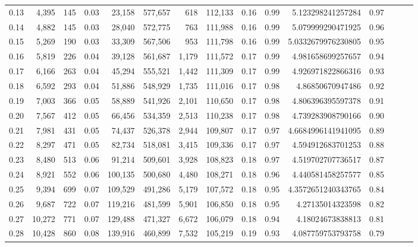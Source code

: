 \begin{tabular}{rrrrrrrrrrrrrrr}
0.13 &   4,395 &    145 &  0.03 &   23,158 &  577,657 &      618 &  112,133 &  0.16 &  0.99 &       5.123298241257284 &      0.97 \\
0.14 &   4,882 &    145 &  0.03 &   28,040 &  572,775 &      763 &  111,988 &  0.16 &  0.99 &       5.079999290471925 &      0.96 \\
0.15 &   5,269 &    190 &  0.03 &   33,309 &  567,506 &      953 &  111,798 &  0.16 &  0.99 &      5.0332679976230805 &      0.95 \\
0.16 &   5,819 &    226 &  0.04 &   39,128 &  561,687 &    1,179 &  111,572 &  0.17 &  0.99 &       4.981658699257657 &      0.94 \\
0.17 &   6,166 &    263 &  0.04 &   45,294 &  555,521 &    1,442 &  111,309 &  0.17 &  0.99 &       4.926971822866316 &      0.93 \\
0.18 &   6,592 &    293 &  0.04 &   51,886 &  548,929 &    1,735 &  111,016 &  0.17 &  0.98 &        4.86850670947486 &      0.92 \\
0.19 &   7,003 &    366 &  0.05 &   58,889 &  541,926 &    2,101 &  110,650 &  0.17 &  0.98 &       4.806396395597378 &      0.91 \\
0.20 &   7,567 &    412 &  0.05 &   66,456 &  534,359 &    2,513 &  110,238 &  0.17 &  0.98 &       4.739283908790166 &      0.90 \\
0.21 &   7,981 &    431 &  0.05 &   74,437 &  526,378 &    2,944 &  109,807 &  0.17 &  0.97 &      4.6684996141941095 &      0.89 \\
0.22 &   8,297 &    471 &  0.05 &   82,734 &  518,081 &    3,415 &  109,336 &  0.17 &  0.97 &       4.594912683701253 &      0.88 \\
0.23 &   8,480 &    513 &  0.06 &   91,214 &  509,601 &    3,928 &  108,823 &  0.18 &  0.97 &       4.519702707736517 &      0.87 \\
0.24 &   8,921 &    552 &  0.06 &  100,135 &  500,680 &    4,480 &  108,271 &  0.18 &  0.96 &       4.440581458257577 &      0.85 \\
0.25 &   9,394 &    699 &  0.07 &  109,529 &  491,286 &    5,179 &  107,572 &  0.18 &  0.95 &      4.3572651240343765 &      0.84 \\
0.26 &   9,687 &    722 &  0.07 &  119,216 &  481,599 &    5,901 &  106,850 &  0.18 &  0.95 &        4.27135014323598 &      0.82 \\
0.27 &  10,272 &    771 &  0.07 &  129,488 &  471,327 &    6,672 &  106,079 &  0.18 &  0.94 &        4.18024673838813 &      0.81 \\
0.28 &  10,428 &    860 &  0.08 &  139,916 &  460,899 &    7,532 &  105,219 &  0.19 &  0.93 &       4.087759753793758 &      0.79 \\

\end{tabular}
